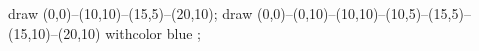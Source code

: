
\startMPpage
    draw (0,0)--(10,10)--(15,5)--(20,10);
    draw (0,0)--(0,10)--(10,10)--(10,5)--(15,5)--(15,10)--(20,10) withcolor blue ;
\stopMPpage
